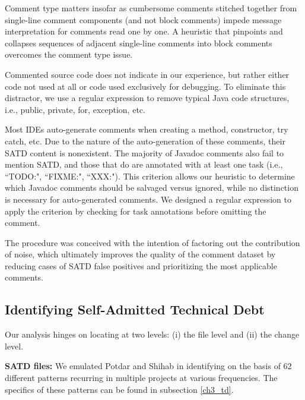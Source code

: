 Comment type matters insofar as cumbersome comments stitched together from single-line comment components (and not block comments) impede message interpretation for comments read one by one. A heuristic that pinpoints and collapses sequences of adjacent single-line comments into block comments overcomes the comment type issue.\par



Commented source code does not indicate \SATD in our experience, but rather either code not used at all or code used exclusively for debugging. To eliminate this distractor, we use a regular expression to remove typical Java code structures, i.e., public, private, for, exception, etc.\par


Most IDEs auto-generate comments when creating a method, constructor, try catch, etc. Due to the nature of the auto-generation of these comments, their SATD content is nonexistent. The majority of Javadoc comments also fail to mention SATD, and those that do are annotated with at least one task (i.e., ``TODO:", ``FIXME:", ``XXX:"). This criterion allows our heuristic to determine which Javadoc comments should be salvaged versus ignored, while no distinction is necessary for auto-generated comments. We designed a regular expression to apply the criterion by checking for task annotations before omitting the comment.\par




The procedure was conceived with the intention of factoring out the contribution of noise, which ultimately improves the quality of the comment dataset by reducing cases of SATD false positives and prioritizing the most applicable comments.\par



\subsection{Identifying Self-Admitted Technical Debt}
\label{ch4_td}


Our analysis hinges on locating \SATD at two levels: (i) the file level and (ii) the change level.

\noindent\textbf{SATD files:}
We emulated Potdar and Shihab \cite{ICSM_PotdarS14} in identifying \SATD on the basis of 62 different patterns recurring in multiple projects at various frequencies. The specifics of these patterns can be found in subsection \ref{ch3_td}.


